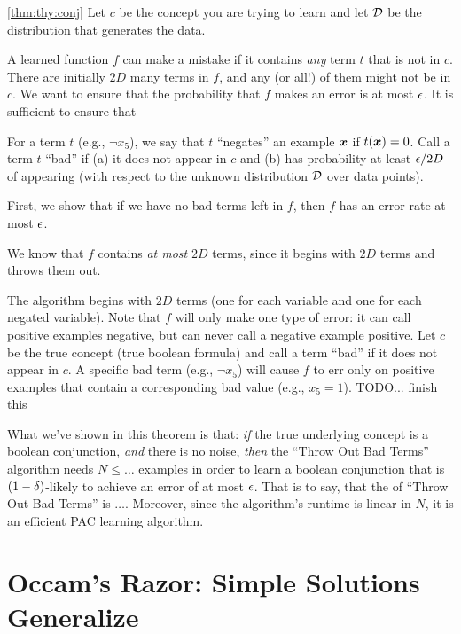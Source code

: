 \begin{myproof}{\ref{thm:thy:conj}}
  Let $c$ be the concept you are trying to learn and let $\mathcal{D}$ be the
  distribution that generates the data.


  A learned function $f$ can make a mistake if it contains \emph{any}
  term $t$ that is not in $c$.  There are initially $2D$ many terms in
  $f$, and any (or all!) of them might not be in $c$.  We want to
  ensure that the probability that $f$ makes an error is at most
  $\epsilon$.  It is sufficient to ensure that

For a term $t$
  (e.g., $\lnot x_5$), we say that $t$ ``negates'' an example ${\boldsymbol{x}}$ if
  $t({\boldsymbol{x}}) = 0$.  Call a term $t$ ``bad'' if (a) it does not appear in
  $c$ and (b) has probability at least $\epsilon/2D$ of appearing (with
  respect to the unknown distribution $\mathcal{D}$ over data points).

  First, we show that if we have no bad terms left in $f$, then $f$
  has an error rate at most $\epsilon$.

We know that $f$ contains \emph{at
    most} $2D$ terms, since it begins with $2D$ terms and throws them
  out.

  The algorithm begins with $2D$ terms (one for each variable and one
  for each negated variable).  Note that $f$ will only make one type
  of error: it can call positive examples negative, but can never call
  a negative example positive.  Let $c$ be the true concept (true
  boolean formula) and call a term ``bad'' if it does not appear in
  $c$.  A specific bad term (e.g., $\lnot x_5$) will cause $f$ to err
  only on positive examples that contain a corresponding bad value
  (e.g., $x_5 = 1$).    TODO... finish this
\end{myproof}

What we've shown in this theorem is that: \emph{if} the true
underlying concept is a boolean conjunction, \emph{and} there is no
noise, \emph{then} the ``Throw Out Bad Terms'' algorithm needs $N \leq
\dots$ examples in order to learn a boolean conjunction that is
$(1-\delta)$-likely to achieve an error of at most $\epsilon$.  That is to
say, that the  of ``Throw Out Bad Terms''
is $\dots$.  Moreover, since the algorithm's runtime is linear in $N$,
it is an efficient PAC learning algorithm.

\section{Occam's Razor: Simple Solutions Generalize}

